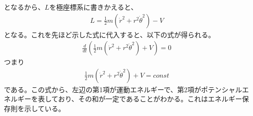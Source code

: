 \documentclass[pdflatex,ja=standard,fleqn]{bxjsarticle}
\begin{document}
となるから、$L$を極座標系に書きかえると、
\begin{eqnarray*}
    L=\frac{1}{2}m(\dot{r}^2+r^2\dot{\theta}^2)-V
\end{eqnarray*}
となる。これを先ほど示した式に代入すると、以下の式が得られる。
\begin{eqnarray*}
    \frac{d}{dt}\left(\frac{1}{2}m(\dot{r}^2+r^2\dot{\theta}^2)+V\right)=0
\end{eqnarray*}
つまり
\begin{eqnarray*}
    \frac{1}{2}m(\dot{r}^2+r^2\dot{\theta}^2)+V=const
\end{eqnarray*}
である。この式から、左辺の第1項が運動エネルギーで、第2項がポテンシャルエネルギーを表しており、その和が一定であることがわかる。これはエネルギー保存則を示している。
\end{document}
